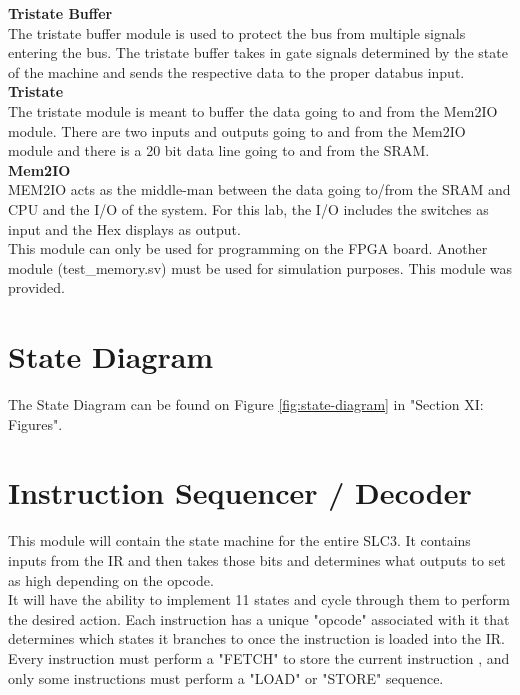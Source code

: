 \documentclass[journal, twocolumn, final,11pt,letterpaper]{IEEEtran}
\begin{document}
\normalsize\textbf{Tristate Buffer} \\

The tristate buffer module is used to protect the bus from multiple signals entering the bus.  The tristate buffer takes in gate signals determined by the state of the machine and sends the respective data to the proper databus input. \\

\normalsize\textbf{Tristate} \\

The tristate module is meant to buffer the data going to and from the Mem2IO module. There are two inputs and outputs going to and from the Mem2IO module and there is a 20 bit data line going to and from the SRAM. \\

\normalsize\textbf{Mem2IO} \\

MEM2IO acts as the middle-man between the data going to/from the SRAM and CPU and the I/O of the system.  For this lab, the I/O includes the switches as input and the Hex displays as output. \\

This module can only be used for programming on the FPGA board. Another module (test\_memory.sv) must be used for simulation purposes. This module was provided.\\

\section{State Diagram}
The State Diagram can be found on Figure \ref{fig:state-diagram} in "Section XI: Figures".

\section{Instruction Sequencer / Decoder}
This module will contain the state machine for the entire SLC3. It contains inputs from the IR and then takes those bits and determines what outputs to set as high depending on the opcode.\\

It will have the ability to implement 11 states and cycle through them to perform the desired action. Each instruction has a unique "opcode" associated with it that determines which states it branches to once the instruction is loaded into the IR.  Every instruction must perform a "FETCH" to store the current instruction , and only some instructions must perform a "LOAD" or "STORE" sequence. \\
\end{document}
